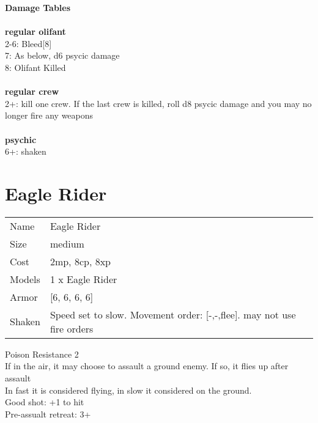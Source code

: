 {\bf Damage Tables} \\
\ \\ {\bf regular olifant } \\
2-6: Bleed[8] \\
7: As below,  d6 psycic damage \\
8: Olifant Killed \\
\ \\ {\bf regular crew } \\
2+: kill one crew. If the last crew is killed, roll d8 psycic damage and you may no longer fire any weapons \\
\ \\ {\bf psychic } \\
6+: shaken \\










\pagebreak\pagebreak

\section{ Eagle Rider }

\begin{tabular}{ll}
  Name & Eagle Rider \\
  Size & medium\\
  Cost & 2mp, 8cp, 8xp\\
  Models & 1 x Eagle Rider\\
  Armor & [6, 6, 6, 6]\\
  Shaken & Speed set to slow. Movement order: [-,-,flee]. may not use fire orders\\
\end{tabular}

\noindent Poison Resistance 2\\ 
If in the air, it may choose to assault a ground enemy. If so, it flies up after assault\\ 
In fast it is considered flying, in slow it considered on the ground.\\ 
Good shot: +1 to hit\\ 
Pre-assualt retreat: 3+\\ 


